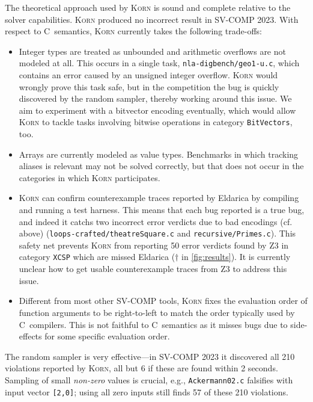 \documentclass{llncs}
\newcommand{\Korn}{\textsc{Korn}\xspace}
\begin{document}
The theoretical approach used by \Korn is sound and complete
relative to the solver capabilities.
\Korn produced no incorrect result in SV-COMP 2023.
With respect to C~semantics, \Korn currently takes the following trade-offs:
\begin{itemize}
\item Integer types are treated as unbounded and arithmetic overflows are not modeled at all.
 This occurs in a single task, \texttt{nla-digbench/geo1-u.c},
 which contains an error caused by an unsigned integer overflow.
 \Korn would wrongly prove this task safe,
 but in the competition the bug is quickly discovered by the random sampler,
 thereby working around this issue.
 We aim to experiment with a bitvector encoding eventually,
 which would allow \Korn to tackle tasks involving bitwise operations in category \texttt{BitVectors}, too.
\item Arrays are currently modeled as value types.
 Benchmarks in which tracking aliases is relevant
 may not be solved correctly, but that does not occur in the categories in which \Korn participates.
\item \Korn can confirm counterexample traces reported by Eldarica by compiling and running a test harness.
 This means that each bug reported is a true bug,
 and indeed it catchs two incorrect error verdicts due to bad encodings (cf. above)
 (\texttt{loops-crafted/theatreSquare.c} and \texttt{recursive/Primes.c}).
 This safety net prevents \Korn from reporting 50 error verdicts found by Z3 in category \texttt{XCSP}
 which are missed Eldarica ($\dagger$ in \cref{fig:results}).
 It is currently unclear how to get usable counterexample traces from Z3 to address this issue.
\item
 Different from most other SV-COMP tools, \Korn fixes the evaluation order of function arguments to be right-to-left
 to match the order typically used by C~compilers.
 This is not faithful to C~semantics as it misses bugs due to side-effects
 for some specific evaluation order.
\end{itemize}

The random sampler is very effective---in SV-COMP 2023 it discovered
all 210 violations reported by \Korn, all but 6 if these are found within 2 seconds.
Sampling of small \emph{non-zero} values is crucial, e.g., \texttt{Ackermann02.c}
falsifies with input vector \texttt{[2,0]};
using all zero inputs still finds 57 of these 210 violations.
\end{document}
